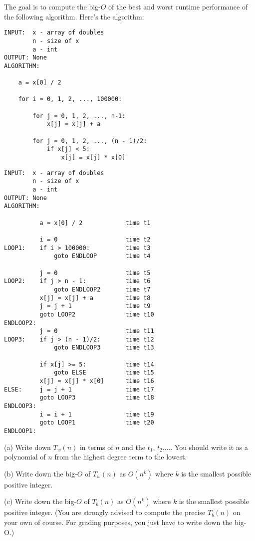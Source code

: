 The goal is to compute the big-$O$ of the best and worst runtime performance
of the following algorithm. 
Here's the algorithm:
\begin{Verbatim}[frame=single]
INPUT:  x - array of doubles
        n - size of x
        a - int
OUTPUT: None
ALGORITHM:

    a = x[0] / 2                           

    for i = 0, 1, 2, ..., 100000:

        for j = 0, 1, 2, ..., n-1:
            x[j] = x[j] + a                

        for j = 0, 1, 2, ..., (n - 1)/2:
            if x[j] < 5:                   
                x[j] = x[j] * x[0]         

\end{Verbatim}

\begin{Verbatim}[frame=single]
INPUT:  x - array of doubles
        n - size of x
        a - int
OUTPUT: None
ALGORITHM:

          a = x[0] / 2            time t1

          i = 0                   time t2           
LOOP1:    if i > 100000:          time t3
              goto ENDLOOP        time t4

          j = 0                   time t5
LOOP2:    if j > n - 1:           time t6
              goto ENDLOOP2       time t7
          x[j] = x[j] + a         time t8
          j = j + 1               time t9
          goto LOOP2              time t10
ENDLOOP2:
          j = 0                   time t11
LOOP3:    if j > (n - 1)/2:       time t12
              goto ENDLOOP3       time t13

          if x[j] >= 5:           time t14
              goto ELSE           time t15
          x[j] = x[j] * x[0]      time t16
ELSE:     j = j + 1               time t17
          goto LOOP3              time t18
ENDLOOP3:
          i = i + 1               time t19
          goto LOOP1              time t20
ENDLOOP1:
\end{Verbatim}


(a) Write down $T_w(n)$ in terms of $n$ and the $t_1$, $t_2$,....
You should write it as a polynomial of $n$ from the highest
degree term to the lowest.

(b) Write down the big-$O$ of $T_w(n)$ as $O(n^k)$
where $k$ is the smallest possible  positive integer.

(c) Write down the big-$O$ of $T_b(n)$ as
$O(n^k)$
where $k$ is the smallest possible  positive integer.
(You are strongly advised to compute the
 precise $T_b(n)$ on your own of course.
For grading purposes, you just have to write down the big-O.)

